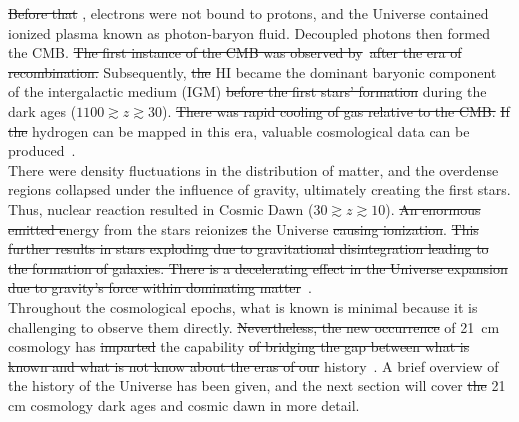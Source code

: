 	\st{Before that} , electrons were not bound to protons, and the Universe contained ionized plasma known as photon-baryon fluid. Decoupled photons then formed the CMB. \st{The first instance of the CMB was observed by}~\citep{1965ApJ...142..419P}\st{after the era of recombination.} 
	Subsequently, \st{the} HI became the dominant baryonic component of the intergalactic medium (IGM) \st{before the first stars' formation} during the dark ages ($1100 \gtrsim z \gtrsim 30$).    \st{There was rapid cooling of gas relative to the CMB.}   \st{If the} hydrogen can be mapped in this era, valuable cosmological data can be produced~\citep{11, 2004PhRvL..92u1301L}.  \\
	
	There were density fluctuations in the distribution of matter, and the overdense regions collapsed under the influence of gravity, ultimately creating the first stars. Thus, nuclear reaction resulted in Cosmic Dawn ($30\gtrsim z \gtrsim 10$). \st{An enormous emitted e}nergy from the  stars  reionize\st{s} the Universe \st{causing ionization}. \st{This further results in stars exploding due to gravitational disintegration leading to the formation of galaxies. There is a decelerating effect in the Universe expansion due to gravity's force within dominating matter}~\citep{2017arXiv170808521D, 2012AdSpR..49..433B}.  \\
	
	Throughout the cosmological epochs, what is known is minimal because it is challenging to observe them directly. \st{Nevertheless, the new occurrence}  of \SI{21}{cm} cosmology has \st{imparted} the capability  \st{of bridging the gap between what is known and what is not know about the eras of our} history~\citep{2014ApJ...782L...9V, 2013PhRvD..87d3002L}.  A brief overview of the history of the Universe has been given, and the next section will cover \st{the} 21 cm cosmology  dark ages and cosmic dawn in more detail.
	           
